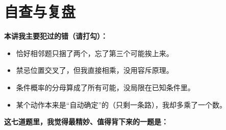 \documentclass[11pt,a4paper]{ctexart}
\begin{document}
{\small \qProbPermNotFirstNotAdjStem}

\newpage

{\small \qProbPermAltParityAdjProbStem}

{\small \qProbPermConsecutiveHitProbStem}

\newpage

{\small \qProbPermCircleInsertStem}

{\small \qProbPermGridPathMeetStem}

\newpage

\section{自查与复盘}

\vspace{0.5em}
\noindent\textbf{本讲我主要犯过的错（请打勾）：}
\begin{itemize}[itemsep=0.4em]
  \item \checkbox 恰好相邻题只捆了两个，忘了第三个可能挨上来。
  \item \checkbox 禁忌位置交叉了，但我直接相乘，没用容斥原理。
  \item \checkbox 条件概率的分母算成了所有可能，没局限在已知条件里。
  \item \checkbox 某个动作本来是“自动确定”的（只剩一条路），我却多乘了一个数。
\end{itemize}

\vspace{1em}
\noindent\textbf{这七道题里，我觉得最精妙、值得背下来的一题是：}
\vspace{0.5em}

\blank{14cm}
\end{document}
